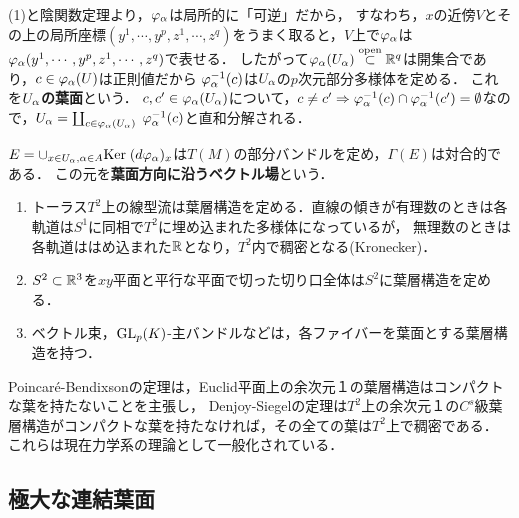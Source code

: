\documentclass[uplatex,dvipdfmx]{jsreport}
\begin{document}
\begin{definition}[leaves]
    (1)と陰関数定理より，$\varphi_\alpha$は局所的に「可逆」だから，
    すなわち，$x$の近傍$V$とその上の局所座標$(y^1,\cdots,y^p,z^1,\cdots,z^q)$をうまく取ると，$V$上で$\varphi_\alpha$は$\varphi_\alpha(y^1,\cdots,y^p,z^1,\cdots,z^q)$で表せる．
    したがって$\varphi_\alpha(U_\alpha)\overset{\mathrm{open}}{\subset}\mathbb{R}^q$は開集合であり，$c\in\varphi_\alpha(U)$は正則値だから
    $\varphi_\alpha^{-1}(c)$は$U_\alpha$の$p$次元部分多様体を定める．
    これを\textbf{$U_\alpha$の葉面}という．
    $c,c'\in\varphi_\alpha(U_\alpha)$について，$c\ne c'\Rightarrow\varphi_\alpha^{-1}(c)\cap\varphi_\alpha^{-1}(c')=\emptyset$なので，$U_\alpha=\coprod_{c\in\varphi_\alpha(U_\alpha)}\;\varphi_{\alpha}^{-1}(c)$と直和分解される．
\end{definition}

\begin{definition}
    $E=\cup_{x\in U_\alpha,\alpha\in A}\mathrm{Ker}\;(d\varphi_\alpha)_x$は$T(M)$の部分バンドルを定め，$\Gamma(E)$は対合的である．
    この元を\textbf{葉面方向に沿うベクトル場}という．
\end{definition}

\begin{example}[foliation]\mbox{}
    \begin{enumerate}
        \item トーラス$T^2$上の線型流は葉層構造を定める．直線の傾きが有理数のときは各軌道は$S^1$に同相で$T^2$に埋め込まれた多様体になっているが，
        無理数のときは各軌道ははめ込まれた$\mathbb{R}$となり，$T^2$内で稠密となる(Kronecker)．
        \item $S^2\subset\mathbb{R}^3$を$xy$平面と平行な平面で切った切り口全体は$S^2$に葉層構造を定める．
        \item ベクトル束，$\mathrm{GL}_p(K)$-主バンドルなどは，各ファイバーを葉面とする葉層構造を持つ．
    \end{enumerate}
\end{example}

\begin{history}
    Poincaré-Bendixsonの定理は，Euclid平面上の余次元１の葉層構造はコンパクトな葉を持たないことを主張し，
    Denjoy-Siegelの定理は$T^2$上の余次元１の$C^s$級葉層構造がコンパクトな葉を持たなければ，その全ての葉は$T^2$上で稠密である．
    これらは現在力学系の理論として一般化されている．
\end{history}

\subsection{極大な連結葉面}
\end{document}
